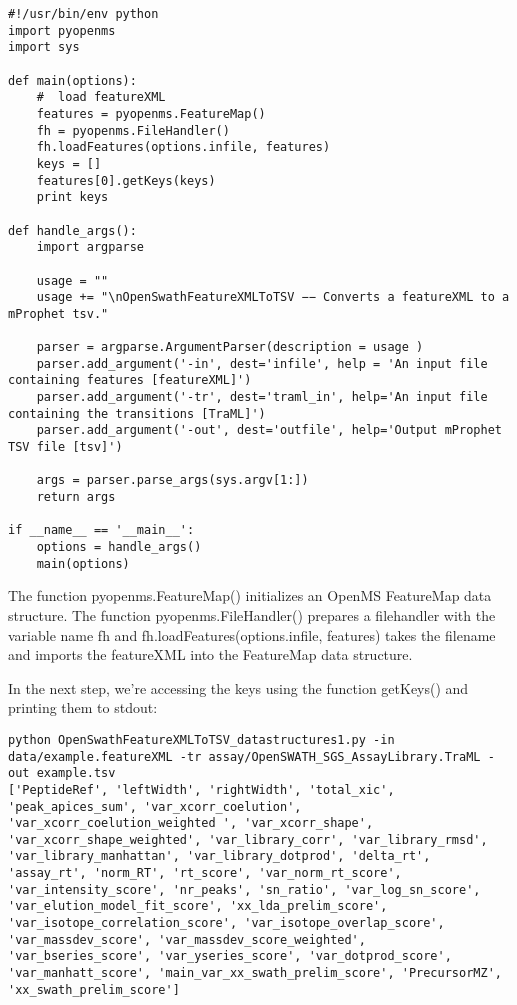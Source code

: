 {\begin{lstlisting}
#!/usr/bin/env python
import pyopenms
import sys

def main(options):
    #  load featureXML
    features = pyopenms.FeatureMap()
    fh = pyopenms.FileHandler()
    fh.loadFeatures(options.infile, features)
    keys = []
    features[0].getKeys(keys)
    print keys

def handle_args():
    import argparse

    usage = ""
    usage += "\nOpenSwathFeatureXMLToTSV −− Converts a featureXML to a mProphet tsv."

    parser = argparse.ArgumentParser(description = usage )
    parser.add_argument('-in', dest='infile', help = 'An input file containing features [featureXML]')
    parser.add_argument('-tr', dest='traml_in', help='An input file containing the transitions [TraML]')
    parser.add_argument('-out', dest='outfile', help='Output mProphet TSV file [tsv]')

    args = parser.parse_args(sys.argv[1:])
    return args

if __name__ == '__main__':
    options = handle_args()
    main(options)
\end{lstlisting}

The function pyopenms.FeatureMap() initializes an OpenMS FeatureMap data structure. The function pyopenms.FileHandler() prepares a filehandler with the variable name fh and fh.loadFeatures(options.infile, features) takes the filename and imports the featureXML into the FeatureMap data structure.

In the next step, we're accessing the keys using the function getKeys() and printing them to stdout:

\begin{lstlisting}
python OpenSwathFeatureXMLToTSV_datastructures1.py -in data/example.featureXML -tr assay/OpenSWATH_SGS_AssayLibrary.TraML -out example.tsv
['PeptideRef', 'leftWidth', 'rightWidth', 'total_xic', 'peak_apices_sum', 'var_xcorr_coelution', 'var_xcorr_coelution_weighted ', 'var_xcorr_shape', 'var_xcorr_shape_weighted', 'var_library_corr', 'var_library_rmsd', 'var_library_manhattan', 'var_library_dotprod', 'delta_rt', 'assay_rt', 'norm_RT', 'rt_score', 'var_norm_rt_score', 'var_intensity_score', 'nr_peaks', 'sn_ratio', 'var_log_sn_score', 'var_elution_model_fit_score', 'xx_lda_prelim_score', 'var_isotope_correlation_score', 'var_isotope_overlap_score', 'var_massdev_score', 'var_massdev_score_weighted', 'var_bseries_score', 'var_yseries_score', 'var_dotprod_score', 'var_manhatt_score', 'main_var_xx_swath_prelim_score', 'PrecursorMZ', 'xx_swath_prelim_score']
\end{lstlisting}

}
